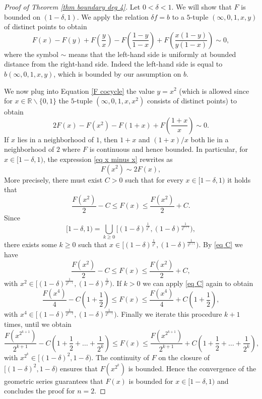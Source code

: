 \documentclass[a4paper]{amsart}
\theoremstyle{definition}
\theoremstyle{remark}
\theoremstyle{TheoremNum}
\renewcommand{\setminus}{\smallsetminus}
\begin{document}
\begin{proof}[Proof of Theorem \ref{thm boundary deg 4}]

Let $0<\delta<1$. We will show that $F$ is bounded on $(1-\delta,1)$. 
We apply the relation $\delta f =b$ to a $5$-tuple $(\infty,0,1,x,y)$ of distinct points
to obtain
\begin{equation}\label{F cocycle}
F(x)-F(y)+F\left(\frac{y}{x}\right)-F\left( \frac{1-y}{1-x} \right) + F\left( \frac{x(1-y)}{y(1-x)} \right) \sim 0,
\end{equation}
where the symbol $\sim$ means that the left-hand side is uniformly at bounded distance from the right-hand side. Indeed the left-hand side is equal to $b(\infty,0,1,x,y)$, which is bounded by our assumption on $b$. 

We now plug into  Equation \eqref{F cocycle} the value $y=x^2$ (which is allowed since for $x\in \mathbb{R}\setminus \{0,1\}$ the $5$-tuple $(\infty,0,1,x,x^2)$ consists of distinct points) to obtain
\begin{equation}\label{eq x minus x}
2F(x)-F(x^2)-F(1+x)+F\left(\frac{1+x}{x}\right) \sim 0.
\end{equation}
If $x$ lies in a neighborhood of $1$, then $1+x$ and $(1+x)/x$ both lie in a neighborhood of $2$ where $F$ is continuous and hence bounded. In particular, for $x\in [1-\delta,1)$, the expression \eqref{eq x minus x} rewrites as 
\begin{equation}\label{eq F twice}
F(x^2) \sim 2F(x),
\end{equation}
More precisely, there must exist  $C>0$ such that for every $x \in [1-\delta,1)$ it holds that 
\begin{equation}\label{eq C}
\frac{F(x^2)}{2}-C \leq F(x) \leq \frac{F(x^2)}{2}+C. 
\end{equation}
Since 
$$
[1-\delta,1)=\bigcup_{k \geq 0} [(1-\delta)^{\frac{1}{2^k}},(1-\delta)^{\frac{1}{2^{k+1}}}),
$$
there exists some $k\geq 0$ such that $x \in [(1-\delta)^{\frac{1}{2^k}},(1-\delta)^{\frac{1}{2^{k+1}}})$. By \eqref{eq C} we have  
$$
\frac{F(x^2)}{2}-C \leq F(x) \leq \frac{F(x^2)}{2}+C,
$$
with $x^2 \in [(1-\delta)^{\frac{1}{2^{k-1}}},(1-\delta)^{\frac{1}{2^k}})$. If $k> 0$ we can apply \eqref{eq C} again to obtain
$$
\frac{F(x^4)}{4}-C\left(1+\frac{1}{2}\right) \leq F(x) \leq \frac{F(x^4)}{4}+C\left(1+\frac{1}{2}\right),
$$
with $x^4 \in [(1-\delta)^{\frac{1}{2^{k-2}}},(1-\delta)^{\frac{1}{2^{k-1}}})$. Finally we iterate this procedure $k+1$ times, until we obtain 
$$
\frac{F(x^{2^{k+1}})}{2^{k+1}}-C\left(1+\frac{1}{2}+\ldots+\frac{1}{2^k}\right) \leq F(x) \leq \frac{F(x^{2^{k+1}})}{2^{k+1}}+C\left(1+\frac{1}{2}+\ldots+\frac{1}{2^k}\right),
$$
with $x^{2^k} \in [(1-\delta)^2,1-\delta)$. The continuity of $F$ on the closure of $[(1-\delta)^2,1-\delta)$ ensures that $F(x^{2^k})$ is bounded. Hence the convergence of the geometric series guarantees that $F(x)$ is bounded for $x \in [1-\delta,1)$ and concludes the proof for $n=2$. 




\end{proof}
\end{document}
